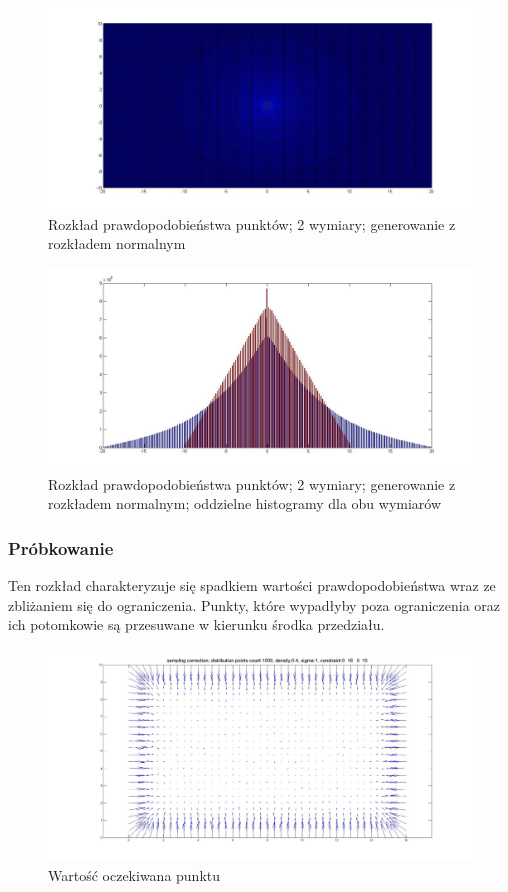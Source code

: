 \documentclass{mini}
\begin{document}
\begin{figure}[H]
\centering
\includegraphics[width=\textwidth]{ri_n_10M_2__20_20__10_10_4}
\caption{Rozkład prawdopodobieństwa punktów; 2 wymiary; generowanie z rozkładem normalnym}
\end{figure}

\begin{figure}[H]
\centering
\includegraphics[width=\textwidth]{ri_n_10M_2__20_20__10_10_4_1D}
\caption{Rozkład prawdopodobieństwa punktów; 2 wymiary; generowanie z rozkładem normalnym; oddzielne histogramy dla obu wymiarów}
\label{bladzenie:reinicjacja2ds}
\end{figure}

\subsubsection*{Próbkowanie}
Ten rozkład charakteryzuje się spadkiem wartości prawdopodobieństwa wraz ze zbliżaniem się do ograniczenia. Punkty, które wypadłyby poza ograniczenia oraz ich potomkowie są przesuwane w kierunku środka przedziału.

\begin{figure}[H]
\centering
\includegraphics[width=\textwidth]{sampling2dprzesuniecie}
\caption{Wartość oczekiwana punktu}
\end{figure}
\end{document}
